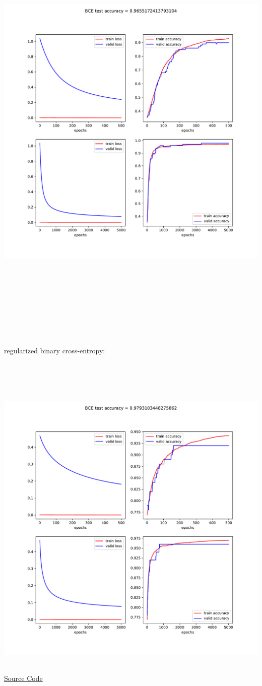\documentclass[17pt]{report}
\begin{document}
\includegraphics[width=15cm, height=15cm]{BCE}\\\\\\\\\\\\\\\\
regularized binary cross-entropy:\\\\\\\\
\includegraphics[width=15cm, height=15cm]{RBCE}\\
\href{https://github.com/zamaniali1995/Linear-Regressions-and-Linear-Models-using-the-Iris-Data}{Source Code}
\end{document}
